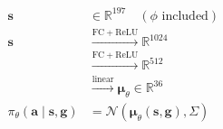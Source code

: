 \documentclass[border=8pt,12pt]{standalone}
\begin{document}
\color{ink}
$\displaystyle \begin{aligned}\mathbf s&\in\mathbb R^{197}\quad(\phi\text{ included})\\ \mathbf s&\xrightarrow{\mathrm{FC+ReLU}}\mathbb R^{1024}\\ &\xrightarrow{\mathrm{FC+ReLU}}\mathbb R^{512}\\ &\xrightarrow{\mathrm{linear}}\boldsymbol\mu_\theta\in\mathbb R^{36}\\ \pi_\theta(\mathbf a\mid\mathbf s,\mathbf g)&=\mathcal N(\boldsymbol\mu_\theta(\mathbf s,\mathbf g),\Sigma)\end{aligned}$
\end{document}
